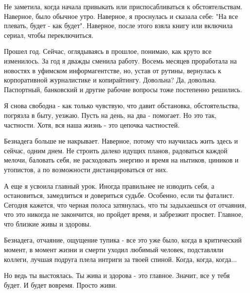 Не заметила, когда начала привыкать или приспосабливаться к обстоятельствам.
Наверное, было обычное утро. Наверное, я проснулась и сказала себе: "На все
плевать, будет - как будет". Наверное, после этого взяла книгу или включила
сериал, чтобы переключиться.

Прошел год. Сейчас, оглядываясь в прошлое, понимаю, как круто все изменилось.
За год я дважды сменила работу. Восемь месяцев проработала на новостях в
уфимском информагентстве, но, устав от рутины, вернулась к корпоративной
журналистике и копирайтингу. Довольна? Да, довольна. Паспортный, банковский и
другие рабочие вопросы тоже постепенно решились.

Я снова свободна - как только чувствую, что давит обстановка, обстоятельства,
погрязла в быту, уезжаю. Пусть на день, на два - помогает. Но это так,
частности. Хотя, вся наша жизнь - это цепочка частностей. 

Безнадега больше не накрывает. Наверное, потому что  научилась жить здесь и
сейчас, одним днем. Не строить далеко идущих планов, радоваться каждой мелочи,
баловать себя, не расходовать энергию и время на нытиков, циников и утопистов,
а по возможности дистанцироваться от них.

А еще я усвоила главный урок. Иногда правильнее не изводить себя, а
остановиться, замедлиться и довериться судьбе. Особенно, если ты фаталист.
Сегодня кажется, что черная полоса затянулась, что ты задыхаешься от отчаяния,
что это никогда не закончится, но пройдет время, и забрезжит просвет. Главное,
что близкие живы и здоровы. 

Безнадега, отчаяние, ощущение тупика - все это уже было, когда в критический
момент, в момент жизни и смерти уходил любимый человек, подставляли коллеги,
лучшая подруга плела интриги за твоей спиной. Когда, когда, когда...

Но ведь ты выстоялась. Ты жива и здорова - это главное. Значит, все у тебя
будет. И будет вовремя. Просто живи.
